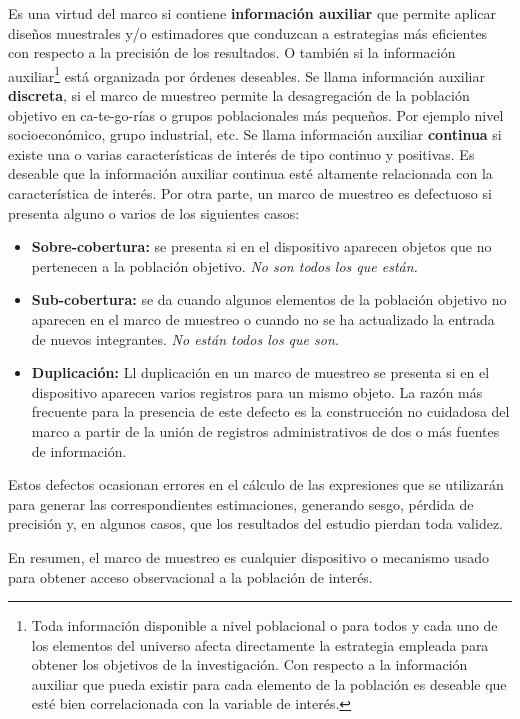 \documentclass[
  12pt,
  spanish,
]{book}
\begin{document}
Es una virtud del marco si contiene \textbf{información auxiliar} que permite aplicar diseños muestrales y/o estimadores que conduzcan a estrategias más eficientes con respecto a la precisión de los resultados. O también si la información auxiliar\footnote{Toda información disponible a nivel poblacional o para todos y cada uno de los elementos del universo afecta directamente la estrategia empleada para obtener los objetivos de la investigación. Con respecto a la información auxiliar que pueda existir para cada elemento de la población es deseable que esté bien correlacionada con la variable de interés.} está organizada por órdenes deseables. Se llama información auxiliar \textbf{discreta}, si el marco de muestreo permite la desagregación de la población objetivo en ca-te-go-rías o grupos poblacionales más pequeños. Por ejemplo nivel socioeconómico, grupo industrial, etc. Se llama información auxiliar \textbf{continua} si existe una o varias características de interés de tipo continuo y positivas. Es deseable que la información auxiliar continua esté altamente relacionada con la característica de interés. Por otra parte, un marco de muestreo es defectuoso si presenta alguno o varios de los siguientes casos:

\begin{itemize}
\item \textbf{Sobre-cobertura:} se presenta si en el dispositivo aparecen objetos que no pertenecen a la población objetivo. \textit{No son todos los que están.}
\item \textbf{Sub-cobertura:} se da cuando algunos elementos de la población objetivo no aparecen en el marco de muestreo o cuando no se ha actualizado la entrada de nuevos integrantes. \textit{No están todos los que son.}
\item \textbf{Duplicación:} Ll duplicación en un marco de muestreo se presenta si en el dispositivo aparecen varios registros para un mismo objeto. La razón más frecuente para la presencia de este defecto es la construcción no cuidadosa del marco a partir de la unión de registros administrativos de dos o más fuentes de información.
\end{itemize}

Estos defectos ocasionan errores en el cálculo de las expresiones que se utilizarán para generar las correspondientes estimaciones, generando sesgo, pérdida de precisión y, en algunos casos, que los resultados del estudio pierdan toda validez.

En resumen, el marco de muestreo es cualquier dispositivo o mecanismo usado para obtener acceso observacional a la población de interés.
\end{document}
